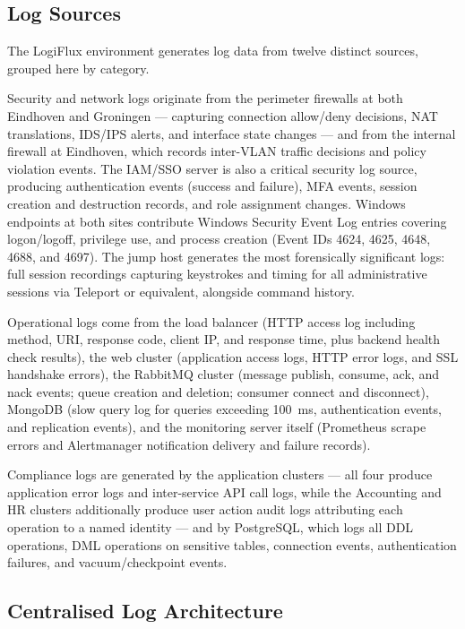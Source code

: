 \subsection{Log Sources}

\label{tab:log-sources}The LogiFlux environment generates log data from twelve distinct sources, grouped here by category.

Security and network logs originate from the perimeter firewalls at both Eindhoven and Groningen --- capturing connection allow/deny decisions, NAT translations, IDS/IPS alerts, and interface state changes --- and from the internal firewall at Eindhoven, which records inter-VLAN traffic decisions and policy violation events. The IAM/SSO server is also a critical security log source, producing authentication events (success and failure), MFA events, session creation and destruction records, and role assignment changes. Windows endpoints at both sites contribute Windows Security Event Log entries covering logon/logoff, privilege use, and process creation (Event IDs 4624, 4625, 4648, 4688, and 4697). The jump host generates the most forensically significant logs: full session recordings capturing keystrokes and timing for all administrative sessions via Teleport or equivalent, alongside command history.

Operational logs come from the load balancer (HTTP access log including method, URI, response code, client IP, and response time, plus backend health check results), the web cluster (application access logs, HTTP error logs, and SSL handshake errors), the RabbitMQ cluster (message publish, consume, ack, and nack events; queue creation and deletion; consumer connect and disconnect), MongoDB (slow query log for queries exceeding 100~ms, authentication events, and replication events), and the monitoring server itself (Prometheus scrape errors and Alertmanager notification delivery and failure records).

Compliance logs are generated by the application clusters --- all four produce application error logs and inter-service API call logs, while the Accounting and HR clusters additionally produce user action audit logs attributing each operation to a named identity --- and by PostgreSQL, which logs all DDL operations, DML operations on sensitive tables, connection events, authentication failures, and vacuum/checkpoint events.

\subsection{Centralised Log Architecture}

